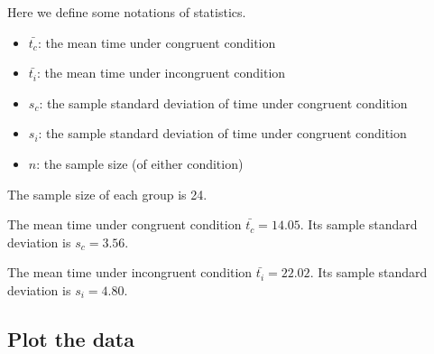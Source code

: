 \documentclass[paper=a4, fontsize=11pt]{scrartcl} %
\numberwithin{equation}{section} %
\numberwithin{figure}{section} %
\numberwithin{table}{section} %
\begin{document}
Here we define some notations of statistics.

\begin{itemize}
    \item $\bar{t_c}$: the mean time under congruent condition
    \item $\bar{t_i}$: the mean time under incongruent condition
    \item $s_c$: the sample standard deviation of time under
        congruent condition
    \item $s_i$: the sample standard deviation of time under
        congruent condition
    \item $n$: the sample size (of either condition)
\end{itemize}

The sample size of each group is 24.

The mean time under congruent condition $\bar{t_c} = 14.05$.
Its sample standard deviation is $s_c = 3.56$.

The mean time under incongruent condition $\bar{t_i} = 22.02$.
Its sample standard deviation is $s_i = 4.80$.

\subsection{Plot the data}
\medskip
\noindent{}
\medskip
\end{document}
